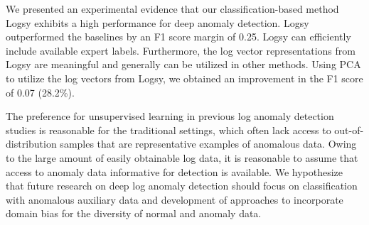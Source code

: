 We presented an experimental evidence that our classification-based method Logsy exhibits a high performance for deep anomaly detection. Logsy outperformed the baselines by an F1 score margin of 0.25. Logsy can efficiently include available expert labels. Furthermore, the log vector representations from Logsy are meaningful and generally can be utilized in other methods. Using PCA to utilize the log vectors from Logsy, we obtained an improvement in the F1 score of 0.07 (28.2\%). 

The preference for unsupervised learning in previous log anomaly detection studies is reasonable for the traditional settings, which often lack access to out-of-distribution samples that are representative examples of anomalous data. Owing to the large amount of easily obtainable log data, it is reasonable to assume that access to anomaly data informative for detection is available. We hypothesize that future research on deep log anomaly detection should focus on classification with anomalous auxiliary data and development of approaches to incorporate domain bias for the diversity of normal and anomaly data. 

